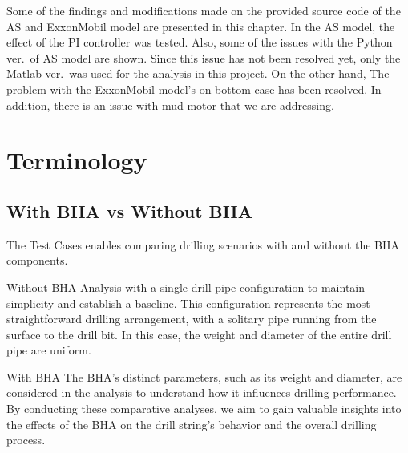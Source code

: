 Some of the findings and modifications made on the provided source code of the AS and ExxonMobil model are presented in this chapter. In the AS model, the effect of the PI controller was tested. Also, some of the issues with the Python ver.\ of AS model are shown. Since this issue has not been resolved yet, only the Matlab ver.\ was used for the analysis in this project. On the other hand, The problem with the ExxonMobil model's on-bottom case has been resolved. In addition, there is an issue with mud motor that we are addressing. 
\section{Terminology}
\subsection{With BHA vs Without BHA}

The Test Cases enables comparing drilling scenarios with and without the BHA components. 

\begin{definition}{Without BHA}
Analysis with a single drill pipe configuration to maintain simplicity and establish a baseline. This configuration represents the most straightforward drilling arrangement, with a solitary pipe running from the surface to the drill bit. In this case, the weight and diameter of the entire drill pipe are uniform.
\end{definition}
\begin{definition}{With BHA}
The BHA's distinct parameters, such as its weight and diameter, are considered in the analysis to understand how it influences drilling performance. By conducting these comparative analyses, we aim to gain valuable insights into the effects of the BHA on the drill string's behavior and the overall drilling process.
\end{definition}



